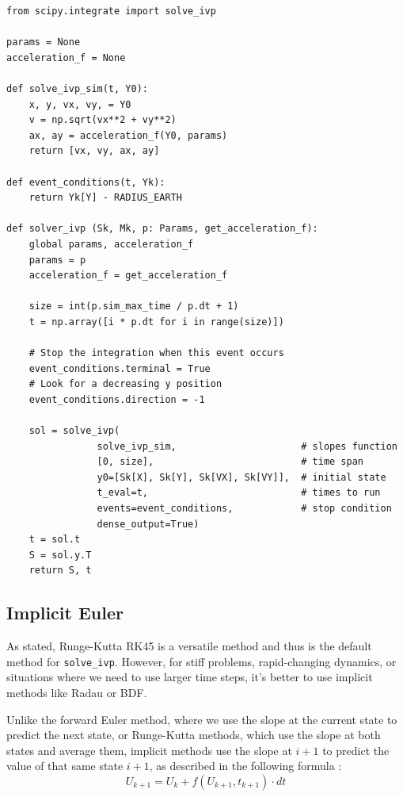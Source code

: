 \documentclass[runningheads]{llncs}
\begin{document}
 
\begin{verbatim}
from scipy.integrate import solve_ivp

params = None
acceleration_f = None

def solve_ivp_sim(t, Y0):
    x, y, vx, vy, = Y0
    v = np.sqrt(vx**2 + vy**2)
    ax, ay = acceleration_f(Y0, params)
    return [vx, vy, ax, ay]

def event_conditions(t, Yk):
    return Yk[Y] - RADIUS_EARTH

def solver_ivp (Sk, Mk, p: Params, get_acceleration_f):
    global params, acceleration_f
    params = p
    acceleration_f = get_acceleration_f
    
    size = int(p.sim_max_time / p.dt + 1)
    t = np.array([i * p.dt for i in range(size)])

    # Stop the integration when this event occurs
    event_conditions.terminal = True  
    # Look for a decreasing y position
    event_conditions.direction = -1   

    sol = solve_ivp(
                solve_ivp_sim,                      # slopes function
                [0, size],                          # time span
                y0=[Sk[X], Sk[Y], Sk[VX], Sk[VY]],  # initial state  
                t_eval=t,                           # times to run
                events=event_conditions,            # stop condition
                dense_output=True)  
    t = sol.t
    S = sol.y.T
    return S, t
\end{verbatim}




\subsection{Implicit Euler}
As stated, Runge-Kutta RK45 is a versatile method and thus is the default method for \texttt{solve\_ivp}. However, for stiff problems, rapid-changing dynamics, or situations where we need to use larger time steps, it's better to use implicit methods like Radau or BDF.

Unlike the forward Euler method, where we use the slope at the current state to predict the next state, or Runge-Kutta methods, which use the slope at both states and average them, implicit methods use the slope at \(i+1\) to predict the value of that same state \(i+1\), as described in the following formula \cite{hornik_optimization}:
\begin{equation}
    U_{k+1} = U_k + f(U_{k+1}, t_{k+1}) \cdot dt
\end{equation}
\end{document}
